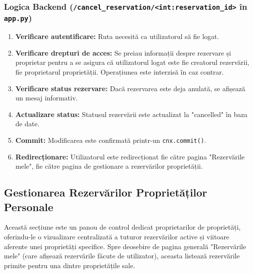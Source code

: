 \documentclass[12pt, a4paper, oneside, romanian]{teza-upb}
\begin{document}
\subsubsection{Logica Backend (\texttt{/cancel\_reservation/<int:reservation\_id>} în \texttt{app.py})}
\begin{enumerate}
	\item \textbf{Verificare autentificare:} Ruta necesită ca utilizatorul să fie logat.
	\item \textbf{Verificare drepturi de acces:} Se preiau informații despre rezervare și proprietar pentru a se asigura că utilizatorul logat este fie creatorul rezervării, fie proprietarul proprietății. Operațiunea este interzisă în caz contrar.
	\item \textbf{Verificare status rezervare:} Dacă rezervarea este deja anulată, se afișează un mesaj informativ.
	\item \textbf{Actualizare status:} Statusul rezervării este actualizat la "cancelled" în baza de date.
	\item \textbf{Commit:} Modificarea este confirmată printr-un \texttt{cnx.commit()}.
	\item \textbf{Redirecționare:} Utilizatorul este redirecționat fie către pagina "Rezervările mele", fie către pagina de gestionare a rezervărilor proprietății.
\end{enumerate}







\subsection{Gestionarea Rezervărilor Proprietăților Personale}


Această secțiune este un panou de control dedicat proprietarilor de proprietăți, oferindu-le o vizualizare centralizată a tuturor rezervărilor active și viitoare aferente unei proprietăți specifice. Spre deosebire de pagina generală "Rezervările mele" (care afișează rezervările făcute de utilizator), aceasta listează rezervările primite pentru una dintre proprietățile sale.
\end{document}

